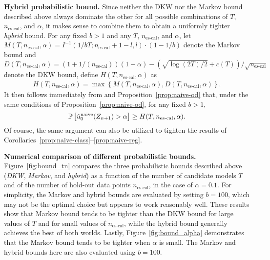 \noindent \textbf{Hybrid probabilistic bound.}
Since neither the DKW nor the Markov bound described above always dominate the other for all possible combinations of $T$, $n_{\text{es-cal}}$, and $\alpha$, it makes sense to combine them to obtain a uniformly tighter {\em hybrid} bound.
For any fixed $b>1$ and any $T$, $n_{\text{es-cal}}$, and $\alpha$, let $M(T,n_{\text{es-cal}},\alpha) = I^{-1} \left(1/{bT}; n_{\text{es-cal}}+1-l,l \right) \cdot (1-1/b)$ denote the Markov bound and $D(T,n_{\text{es-cal}},\alpha) =\left(1+{1}/(n_{\text{es-cal}})\right)(1-\alpha)-(\sqrt{\log(2T)/2}+c(T))/{\sqrt{n_{\text{es-cal}}}}$ denote the DKW bound, define $H(T,n_{\text{es-cal}},\alpha)$ as
\begin{align*}
    H(T,n_{\text{es-cal}},\alpha)
  = \max\left\{ M(T,n_{\text{es-cal}},\alpha), D(T,n_{\text{es-cal}},\alpha) \right\}.
\end{align*}
It then follows immediately from \citet{efficiency_first_cp} and Proposition~\ref{prop:naive-od} that, under the same conditions of Proposition~\ref{prop:naive-od}, for any  fixed $b>1$,
$$\P{\hat{u}^{\textup{naive}}_0(Z_{n+1}) > \alpha} \geq H(T,n_{\text{es-cal}},\alpha).$$
Of course, the same argument can also be utilized to tighten the results of Corollaries~\ref{prop:naive-class}--\ref{prop:naive-reg}.

\noindent \textbf{Numerical comparison of different probabilistic bounds.}
Figure~\ref{fig:bound_tn} compares the three probabilistic bounds described above ({\em DKW}, {\em Markov}, and {\em hybrid}) as a function of the number of candidate models $T$ and of the number of hold-out data points $n_{\text{es-cal}}$, in the case of $\alpha=0.1$. For simplicity, the Markov and hybrid bounds are evaluated by setting $b=100$, which may not be the optimal choice but appears to work reasonably well. These results show that Markov bound tends to be tighter than the DKW bound for large values of $T$ and for small values of $n_{\text{es-cal}}$, while the hybrid bound generally achieves the best of both worlds.
Lastly, Figure~\ref{fig:bound_alpha} demonstrates that the Markov bound tends to be tighter when $\alpha$ is small. The Markov and hybrid bounds here are also evaluated using $b=100$.

